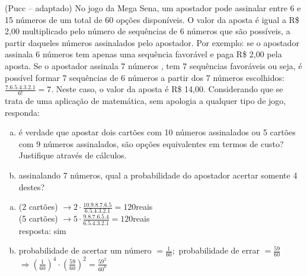 \begin{ex}
(Pucc – adaptado) No jogo da Mega Sena, um apostador pode assinalar entre 6 e 15 números de um total de 60 opções disponíveis. O valor da aposta é igual a R\$ 2,00 multiplicado pelo número de sequências  de 6 números que são possíveis, a partir daqueles números assinalados pelo apostador.
Por exemplo: se o apostador assinala 6 números tem apenas uma sequência favorável e paga R\$ 2,00 pela aposta.  Se o apostador assinala 7 números , tem 7 sequências favoráveis ou seja, é possível formar 7 sequências de 6 números a partir dos 7 números escolhidos: $\frac{7.6.5.4.3.2.1}{6!} = 7$. Neste caso, o valor da aposta é R\$ 14,00. Considerando que se trata de uma aplicação de matemática, sem apologia a qualquer tipo de jogo, responda:
   \begin{enumerate}[(a)]
   \item	é verdade que apostar dois cartões com 10 números assinalados ou 5 cartões com 9 números assinalados, são opções equivalentes em termos de custo? Justifique através de cálculos.
   \item 	assinalando 7 números, qual a probabilidade do apostador acertar somente 4 destes?
   \end{enumerate}
     \begin{sol}
      \phantom{a}
       \begin{enumerate} [(a)]
           \item (2 cartões) $\rightarrow 2\cdot\frac{10.9.8.7.6.5}{6.5.4.3.2.1}=120$\hspace{0,2cm}reais\\
            (5 cartões) $\rightarrow 5\cdot\frac{9.8.7.6.5.4}{6.5.4.3.2.1}=120$\hspace{0,2cm}reais \\
            resposta: sim
           \item probabilidade de acertar um número $= \frac{1}{60};$\hspace{0,2cm} probabilidade de errar $=\frac{59}{60}$ \\
           $\Longrightarrow (\frac{1}{60})^4\cdot(\frac{59}{60})^2=\frac{59^2}{60^6}$
           
       \end{enumerate}
     \end{sol}
\end{ex}